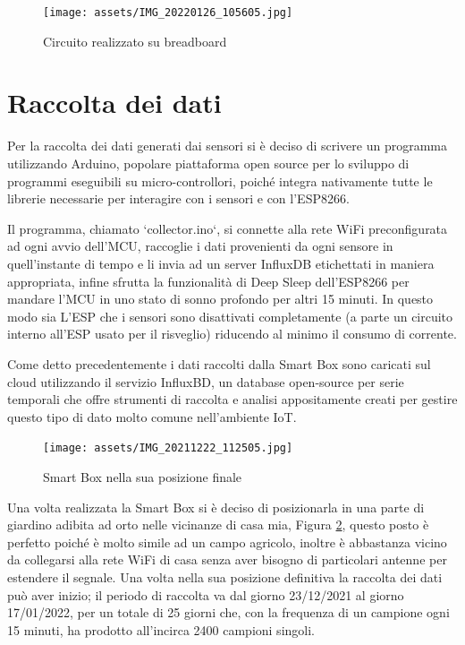 \documentclass[fleqn, 12pt]{SelfArx}
\begin{document}
\begin{figure}[htb]
\centering
\texttt{[image: assets/IMG\_20220126\_105605.jpg]}
\caption{Circuito realizzato su breadboard}
\label{fig:assembled}
\end{figure}

\section{Raccolta dei dati}

Per la raccolta dei dati generati dai sensori si è deciso di scrivere un programma utilizzando Arduino\cite{arduino}, popolare piattaforma open source per lo sviluppo di programmi eseguibili su micro-controllori, poiché 
integra nativamente tutte le librerie necessarie per interagire con i sensori e con l'ESP8266. 

Il programma, chiamato `collector.ino`, si connette alla rete WiFi preconfigurata ad ogni avvio dell'MCU, raccoglie i dati provenienti da ogni sensore in quell'instante di tempo e li invia ad un server InfluxDB\cite{influxdb} 
etichettati in maniera appropriata, infine sfrutta la funzionalità di Deep Sleep dell'ESP8266 per mandare l'MCU in uno stato di sonno profondo per altri 15 minuti. In questo modo sia L'ESP che i sensori sono 
disattivati completamente (a parte un circuito interno all'ESP usato per il risveglio) riducendo al minimo il consumo di corrente.

Come detto precedentemente i dati raccolti dalla Smart Box sono caricati sul cloud utilizzando il servizio InfluxBD, un database open-source per serie temporali che offre strumenti di raccolta e analisi appositamente 
creati per gestire questo tipo di dato molto comune nell'ambiente IoT.

\begin{figure}[htb]
\centering
\texttt{[image: assets/IMG\_20211222\_112505.jpg]}
\caption{Smart Box nella sua posizione finale}
\label{fig:inplace}
\end{figure}

Una volta realizzata la Smart Box si è deciso di posizionarla in una parte di giardino adibita ad orto nelle vicinanze di casa mia, Figura \ref{fig:inplace}, questo posto è perfetto poiché è molto simile ad un campo agricolo, 
inoltre è abbastanza vicino da collegarsi alla rete WiFi di casa senza aver bisogno di particolari antenne per estendere il segnale. 
Una volta nella sua posizione definitiva la raccolta dei dati può aver inizio; il periodo di raccolta va dal giorno 23/12/2021 al giorno 17/01/2022, per un totale di 25 giorni che, con la frequenza di un campione 
ogni 15 minuti, ha prodotto all'incirca 2400 campioni singoli.
\end{document}
